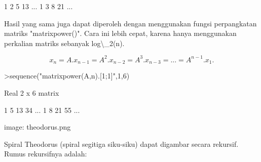 \documentclass[12pt,arial,letterpaper]{book}
\begin{document}
\begin{eulernootebook}
\begin{eulercomment}
\begin{eulercomment}
\begin{eulernootebook}
\begin{eulercomment}
\begin{eulercomment}
\begin{eulercomment}
\begin{eulercomment}
\begin{eulercomment}
\begin{eulercomment}
\begin{eulernotebook}
\begin{eulercomment}
\begin{eulercomment}
\begin{eulercomment}
\begin{eulercomment}
\begin{eulercomment}
\begin{eulercomment}
\begin{eulercomment}
\begin{eulercomment}
\begin{eulercomment}
\begin{eulercomment}
\begin{eulercomment}
\begin{eulercomment}
\begin{eulercomment}
\begin{eulercomment}
\begin{eulercomment}
\begin{eulercomment}
\begin{eulercomment}
\begin{eulercomment}
\begin{eulercomment}
\begin{eulercomment}
\begin{eulercomment}
\begin{eulercomment}
\begin{eulercomment}
\begin{eulercomment}
\begin{eulercomment}
\begin{eulercomment}
\begin{euleroutput}
              1             2             5            13     ...
              1             3             8            21     ...
\end{euleroutput}
\begin{eulercomment}
Hasil yang sama juga dapat diperoleh dengan menggunakan fungsi
perpangkatan matriks "matrixpower()". Cara ini lebih cepat, karena
hanya menggunakan perkalian matriks sebanyak log\textbackslash{}\_2(n).

\end{eulercomment}
\begin{eulerformula}
\[
x_n=A.x_{n-1}=A^2.x_{n-2}=A^3.x_{n-3}= ... = A^{n-1}.x_1.
\]
\end{eulerformula}
\begin{eulerprompt}
>sequence("matrixpower(A,n).[1;1]",1,6)
\end{eulerprompt}
\begin{euleroutput}
  Real 2 x 6 matrix
  
              1             5            13            34     ...
              1             8            21            55     ...
\end{euleroutput}
\begin{eulercomment}
\begin{eulercomment}
\begin{eulercomment}
image: theodorus.png

Spiral Theodorus (spiral segitiga siku-siku) dapat digambar secara
rekursif. Rumus rekursifnya adalah:


\end{eulercomment}
\end{eulercomment}
\end{eulercomment}
\end{eulercomment}
\end{eulercomment}
\end{eulercomment}
\end{eulercomment}
\end{eulercomment}
\end{eulercomment}
\end{eulercomment}
\end{eulercomment}
\end{eulercomment}
\end{eulercomment}
\end{eulercomment}
\end{eulercomment}
\end{eulercomment}
\end{eulercomment}
\end{eulercomment}
\end{eulercomment}
\end{eulercomment}
\end{eulercomment}
\end{eulercomment}
\end{eulercomment}
\end{eulercomment}
\end{eulercomment}
\end{eulercomment}
\end{eulercomment}
\end{eulercomment}
\end{eulercomment}
\end{eulernotebook}
\end{eulercomment}
\end{eulercomment}
\end{eulercomment}
\end{eulercomment}
\end{eulercomment}
\end{eulercomment}
\end{eulernootebook}
\end{eulercomment}
\end{eulercomment}
\end{eulernootebook}
\end{document}
